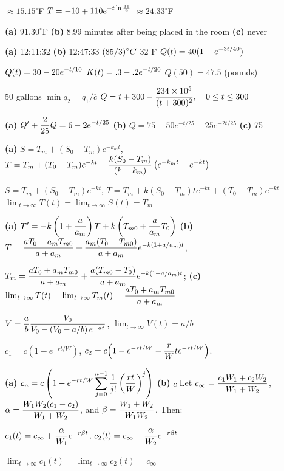 \medskip

 $\approx15.15^{\circ}$F
 $\displaystyle{T=-10+110e^{-t\ln\frac{11}{9}}}$
  $\approx24.33^{\circ}$F

 {\bf (a)}  $91.30^{\circ}$F
{\bf (b)} 8.99 minutes after being placed in the room {\bf (c)} never

 {\bf (a)} 12:11:32 {\bf (b) }12:47:33
  $\displaystyle{(85/3)^{\circ}C}$
  $32^{\circ}$F
  $\displaystyle{Q(t)=40(1-e^{-3t/40})}$

  $\displaystyle{Q(t)=30-20e^{-t/10}}$
  $\displaystyle{K(t)=.3-.2e^{-t/20}}$
   $Q(50)=47.5$ (pounds)

  50 gallons
  $\min q_{2}=q_{1}/\overline{c}$
 $\displaystyle{Q=t+300-\frac{234\times10^{5}}{(t+300)^{2}},
\quad0\le t\le300}$

{\bf (a)} $\displaystyle{Q'+\frac{2}{25}Q=6-2e^{-t/25}}$
{\bf (b)} $Q=75-50e^{-t/25}-25e^{-2t/25}$ {\bf (c)} 75

{\bf (a)}
$S=T_{m}+(S_{0}-T_{m})e^{-k_{m}t}$, $T=T_{m}+(T_{0}-T_{m})e^{-kt}+\displaystyle\frac{k(S_{0}-T_{m})}{(k-k_{m})}\left(e^{-k_{m}t}-e^{-kt}\right)$

\quad {}
$S=T_{m}+(S_{0}-T_{m})e^{-kt}$, $T=T_{m}+k(S_{0}-T_{m})te^{-kt}+(T_{0}-T_{m})e^{-kt}$
  $\lim_{t\to\infty}T(t)=\lim_{t\to\infty}S(t)=T_{m}$

 {\bf (a)} $T'=\displaystyle{-k\left(1+\frac{a}{a_{m}}\right)T
+k\left(T_{m0}+\frac{a}{a_{m}}T_{0}\right)}$ \;
 {\bf (b)} $\displaystyle{T=\frac{aT_{0}+a_{m}T_{m0}}{a+a_{m}}+\frac{a_{m}(T_{0}-T_{m0})}{a+a_{m}}e^{-k(1+a/a_{m})t}}$,

\quad \quad   $\displaystyle{T_{m}=\frac{aT_{0}+a_{m}T_{m0}}{a+a_{m}}+\frac{a(T_{m0}-T_{0})}{a+a_{m}}e^{-k(1+a/a_{m})t}}$;
{\bf (c)} $\lim_{t\to\infty}T(t)=
 \lim_{t\to\infty}T_{m}(t)=\displaystyle\frac{aT_{0}+a_{m}T_{m0}}{a+a_{m}}$

$V=\displaystyle\frac{a}{b}\displaystyle\frac{V_{0}}{V_{0}-\left(V_{0}-a/b
\right)e^{-at}}$, \quad $\lim_{t\to\infty}V(t)=a/b$

$c_{1}=c\left(1-e^{-rt/W}\right)$,
$c_{2}=c\displaystyle{\left(1-e^{-rt/W}-\frac{r}{W}te^{-rt/W}\right)}$.

{\bf (a)} $\displaystyle{c_{n}=c\left(1-e^{-rt/W}\sum_{j=0}^{n-1}\frac{1}{j!}\left(\frac{rt}{W}\right)^{j}\right)}$
{\bf (b)} $c$  
Let $c_{\infty}=\displaystyle\frac{c_{1}W_{1}+c_{2}W_{2}}{W_{1}+W_{2}}$,
$\alpha=\displaystyle\frac{W_{1}W_{2}(c_{1}-c_{2})}{W_{1}+W_{2}}$, and
$\beta=\displaystyle\frac{W_{1}+W_{2}}{W_{1}W_{2}}$. Then:

\quad {} $c_{1}(t)=c_{\infty}+\displaystyle\frac{\alpha}{W_{1}}e^{-r\beta t}$,
 $c_{2}(t)=c_{\infty}-\displaystyle\frac{\alpha}{W_{2}}e^{-r\beta t}$

\quad {}
$\lim_{t\to\infty}c_{1}(t)=\lim_{t\to\infty}c_{2}(t)=c_{\infty}$

\medskip

